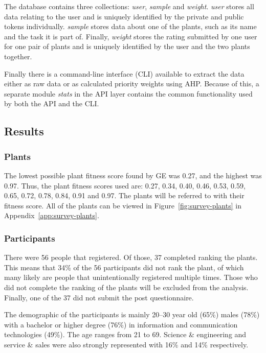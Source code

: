 The database contains three collections: \textit{user}, \textit{sample} and \textit{weight}.
\textit{user} stores all data relating to the user and is uniquely identified by the private and public tokens individually.
\textit{sample} stores data about one of the plants, such as its name and the task it is part of.
Finally, \textit{weight} stores the rating submitted by one user for one pair of plants and is uniquely identified by the user and the two plants together.

Finally there is a command-line interface (CLI) available to extract the data either as raw data or as calculated priority weights using AHP.
Because of this, a separate module \textit{stats} in the API layer contains the common functionality used by both the API and the CLI.

\subsection{Results}
\subsubsection{Plants}
The lowest possible plant fitness score found by \gls{GE} was 0.27, and the highest was 0.97.
Thus, the plant fitness scores used are: 0.27, 0.34, 0.40, 0.46, 0.53, 0.59, 0.65, 0.72, 0.78, 0.84, 0.91 and 0.97.
The plants will be referred to with their fitness score.
All of the plants can be viewed in Figure~\ref{fig:survey-plants} in Appendix~\ref{app:survey-plants}.

\subsubsection{Participants}

There were 56 people that registered.
Of those, 37 completed ranking the plants.
This means that 34\% of the 56 participants did not rank the plant, of which many likely are people that unintentionally registered multiple times.
Those who did not complete the ranking of the plants will be excluded from the analysis.
Finally, one of the 37 did not submit the post questionnaire.

The demographic of the participants is mainly 20--30 year old (65\%) males (78\%) with a bachelor or higher degree (76\%) in information and communication technologies (49\%).
The age ranges from 21 to 69.
Science \& engineering and service \& sales were also strongly represented with 16\% and 14\% respectively.

